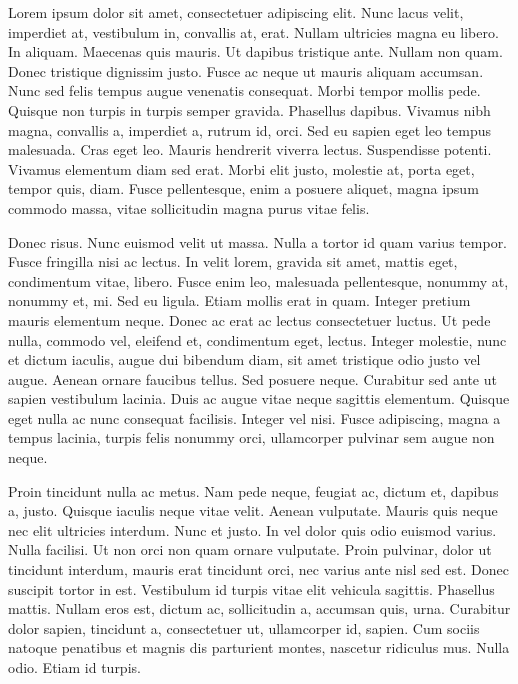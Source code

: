 Lorem ipsum dolor sit amet, consectetuer adipiscing elit. Nunc lacus velit, imperdiet at, vestibulum in, convallis at, erat. Nullam ultricies magna eu libero. In aliquam. Maecenas quis mauris. Ut dapibus tristique ante. Nullam non quam. Donec tristique dignissim justo. Fusce ac neque ut mauris aliquam accumsan. Nunc sed felis tempus augue venenatis consequat. Morbi tempor mollis pede. Quisque non turpis in turpis semper gravida. Phasellus dapibus. Vivamus nibh magna, convallis a, imperdiet a, rutrum id, orci. Sed eu sapien eget leo tempus malesuada. Cras eget leo. Mauris hendrerit viverra lectus. Suspendisse potenti. Vivamus elementum diam sed erat. Morbi elit justo, molestie at, porta eget, tempor quis, diam. Fusce pellentesque, enim a posuere aliquet, magna ipsum commodo massa, vitae sollicitudin magna purus vitae felis. 

Donec risus. Nunc euismod velit ut massa. Nulla a tortor id quam varius tempor. Fusce fringilla nisi ac lectus. In velit lorem, gravida sit amet, mattis eget, condimentum vitae, libero. Fusce enim leo, malesuada pellentesque, nonummy at, nonummy et, mi. Sed eu ligula. Etiam mollis erat in quam. Integer pretium mauris elementum neque. Donec ac erat ac lectus consectetuer luctus. Ut pede nulla, commodo vel, eleifend et, condimentum eget, lectus. Integer molestie, nunc et dictum iaculis, augue dui bibendum diam, sit amet tristique odio justo vel augue. Aenean ornare faucibus tellus. Sed posuere neque. Curabitur sed ante ut sapien vestibulum lacinia. Duis ac augue vitae neque sagittis elementum. Quisque eget nulla ac nunc consequat facilisis. Integer vel nisi. Fusce adipiscing, magna a tempus lacinia, turpis felis nonummy orci, ullamcorper pulvinar sem augue non neque. 

Proin tincidunt nulla ac metus. Nam pede neque, feugiat ac, dictum et, dapibus a, justo. Quisque iaculis neque vitae velit. Aenean vulputate. Mauris quis neque nec elit ultricies interdum. Nunc et justo. In vel dolor quis odio euismod varius. Nulla facilisi. Ut non orci non quam ornare vulputate. Proin pulvinar, dolor ut tincidunt interdum, mauris erat tincidunt orci, nec varius ante nisl sed est. Donec suscipit tortor in est. Vestibulum id turpis vitae elit vehicula sagittis. Phasellus mattis. Nullam eros est, dictum ac, sollicitudin a, accumsan quis, urna. Curabitur dolor sapien, tincidunt a, consectetuer ut, ullamcorper id, sapien. Cum sociis natoque penatibus et magnis dis parturient montes, nascetur ridiculus mus. Nulla odio. Etiam id turpis. 
